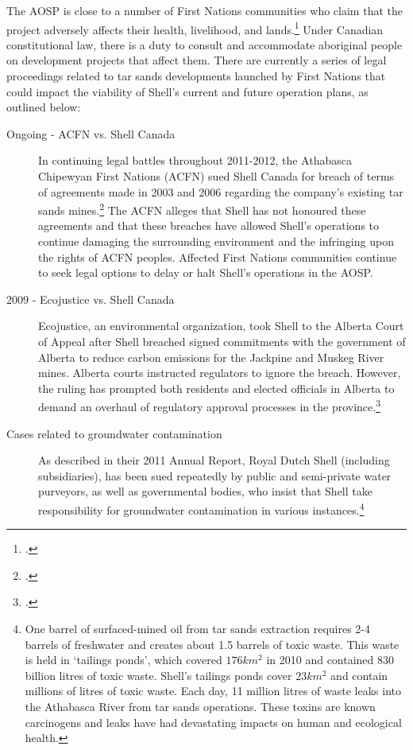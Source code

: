 The AOSP is close to a number of First Nations communities who claim that the project adversely affects their health, livelihood, and lands.\footcite[][]{RiskingRuin_2012}  
Under Canadian constitutional law, there is a duty to consult and accommodate aboriginal people on development projects that affect them.
There are currently a series of legal proceedings related to tar sands developments launched by First Nations that could impact the viability of Shell's current and future operation plans, as outlined below:
\begin{description}
	\item [Ongoing - ACFN vs. Shell Canada] In continuing legal battles throughout 2011-2012, the Athabasca Chipewyan First Nations (ACFN) sued Shell Canada for breach of terms of agreements made in 2003 and 2006 regarding the company's existing tar sands mines.\footcite{FNSues} The ACFN alleges that Shell has not honoured these agreements and that these breaches have allowed Shell's operations to continue damaging the surrounding environment and the infringing upon the rights of ACFN peoples. Affected First Nations communities continue to seek legal options to delay or halt Shell's operations in the AOSP.
	\item [2009 - Ecojustice vs. Shell Canada] Ecojustice, an environmental organization, took Shell to the Alberta Court of Appeal after Shell breached signed commitments with the government of Alberta to reduce carbon emissions for the Jackpine and Muskeg River mines. Alberta courts instructed regulators to ignore the breach. However, the ruling has prompted both residents and elected officials in Alberta to demand an overhaul of regulatory approval processes in the province.\footcite[][]{RiskingRuin_2012}
	\item [Cases related to groundwater contamination] As described in their 2011 Annual Report, Royal Dutch Shell (including subsidiaries), has been sued repeatedly by public and semi-private water purveyors, as well as governmental bodies, who insist that Shell take responsibility for groundwater contamination in various instances.\footnote{One barrel of surfaced-mined oil from tar sands extraction requires 2-4 barrels of freshwater and creates about 1.5 barrels of toxic waste. This waste is held in `tailings ponds', which covered $176 km^2$ in 2010 and contained 830 billion litres of toxic waste. Shell's tailings ponds cover $23 km^2$ and contain millions of litres of toxic waste. Each day, 11 million litres of waste leaks into the Athabasca River from tar sands operations. These toxins are known carcinogens and leaks have had devastating impacts on human and ecological health.} 

\end{description}
